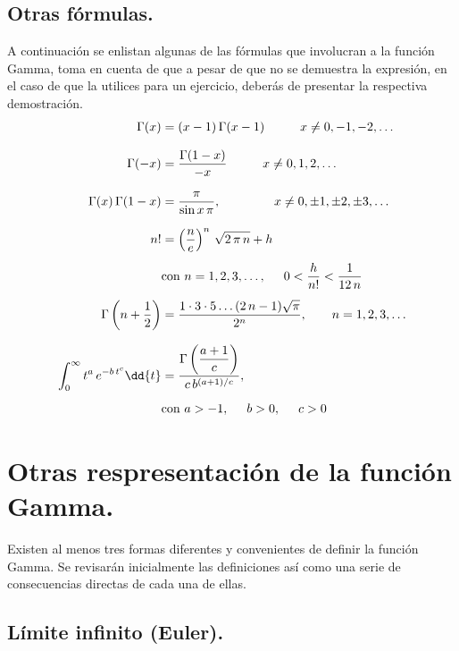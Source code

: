 \subsection{Otras fórmulas.}

A continuación se enlistan algunas de las fórmulas que involucran a la función Gamma, toma en cuenta de que a pesar de que no se demuestra la expresión, en el caso de que la utilices para un ejercicio, deberás de presentar la respectiva demostración.
{%
\begin{align*}
\Gamma (x) &= (x - 1) \, \Gamma(x - 1) \hspace{1cm} x \neq 0, -1, -2, \ldots \\[0.75em]
\Gamma (-x) &= \dfrac{\Gamma (1- x)}{-x} \hspace{1cm} x \neq 0, 1, 2, \ldots \\[0.75em]
\Gamma (x) \, \Gamma (1 - x) &= \dfrac{\pi}{\sin x \, \pi}, \hspace{1.5cm} x \neq 0, \pm 1, \pm 2, \pm 3, \ldots \\[0.75em]
n! &= \left( \dfrac{n}{e} \right)^{n} \, \sqrt{2 \, \pi \, n} + h \\[0.5em]
&\mbox{con } n = 1, 2, 3, \ldots, \hspace{0.5cm} 0 < \dfrac{h}{n!} < \dfrac{1}{12 \, n} \\[0.5em]
\Gamma \left(n + \dfrac{1}{2} \right) &= \dfrac{1 \cdot 3 \cdot 5 \ldots (2 \, n - 1)\sqrt{\pi}}{2^{n}}, \hspace{0.7cm} n = 1, 2, 3, \ldots \\[0.75em]
\int_{0}^{\infty} t^{a} \, e^{-b \, t^{c}} \dd{t} &= \dfrac{\Gamma \left(\dfrac{a + 1}{c} \right)}{c \, b^{(a+1)/c}}, \\[0.5em]
&\mbox{con } a > -1, \hspace{0.5cm} b > 0, \hspace{0.5cm} c > 0   
\end{align*}
}

\section{Otras respresentación de la función Gamma.} \label{seccion:otras_respresentaciones}

Existen al menos tres formas diferentes y convenientes de definir la función Gamma. Se revisarán inicialmente las definiciones así como una serie de consecuencias directas de cada una de ellas.

\subsection{Límite infinito (Euler).}

